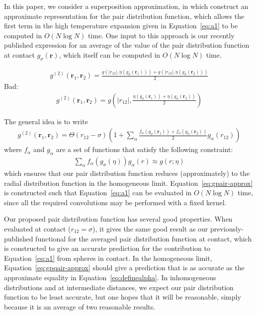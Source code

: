 \documentclass[letterpaper,twocolumn,amsmath,amssymb,pre,aps,10pt]{revtex4-1}
\newcommand{\rr}{\textbf{r}}
\begin{document}
In this paper, we consider a superposition approximation, in which
construct an approximate representation for the pair distribution
function, which allows the first term in the high temperature
expansion given in Equation~\ref{eq:a1} to be computed in $O(N\log N)$
time.  One input to this approach is our recently published expression
for an average of the value of the pair distribution function at
contact $g_\sigma(\rr)$, which itself can be computed in $O(N\log N)$
time.

\begin{align}
  g^{(2)}(\rr_1,\rr_2) = \frac{g(|r_{12}|, \eta(g_\sigma(\rr_1))) + g(|r_{12}|, \eta(g_\sigma(\rr_2)))}{2}
\end{align}
Bad:
\begin{align}
  g^{(2)}(\rr_1,\rr_2) = g\left(|r_{12}|, \frac{\eta(g_\sigma(\rr_1)) + \eta(g_\sigma(\rr_2))}{2}\right)
\end{align}

The general idea is to write
\begin{align}
  g^{(2)}(\rr_1,\rr_2) = \Theta(r_{12}-\sigma)
  \left(1 + \sum_{\alpha} \frac{f_{\alpha}(g_\sigma(\rr_1)) + f_{\alpha}(g_\sigma(\rr_2))}{2}g_{\alpha}(r_{12})\right)\label{eq:gpair-approx}
\end{align}
where $f_{\alpha}$ and $g_{\alpha}$ are a set of functions that
satisfy the following constraint:
\begin{align}\label{eq:definealpha}
  \sum_{\alpha} f_{\alpha}(g_\sigma(\eta)) g_{\alpha}(r) \approx g(r; \eta)
\end{align}
which ensures that our pair distribution function reduces
(approximately) to the radial distribution function in the homogeneous
limit.  Equation~\ref{eq:gpair-approx} is constructed such that
Equation~\ref{eq:a1} can be evaluated in $O(N\log N)$ time, since all
the required convolutions may be performed with a fixed kernel.

Our proposed pair distribution function has several good properties.
When evaluated at contact ($r_{12}=\sigma$), it gives the same good
result as our previously-published functional for the averaged pair
distribution function at contact, which is constructed to give an
accurate prediction for the contribution to Equation~\ref{eq:a1} from
spheres in contact.  In the homogeneous limit,
Equation~\ref{eq:gpqair-approx} should give a prediction that is as
accurate as the approximate equality in
Equation~\ref{eq:definealpha}.  In inhomogeneous distributions and at
intermediate distances, we expect our pair distribution function to be
least accurate, but one hopes that it will be reasonable, simply
because it is an average of two reasonable results.
\end{document}
